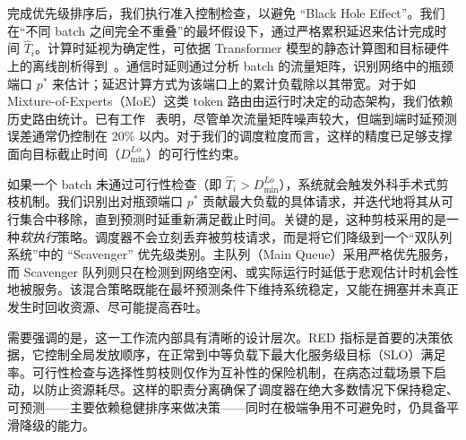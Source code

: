  完成优先级排序后，我们执行准入控制检查，以避免 “Black Hole Effect”。我们在“不同 batch 之间完全不重叠”的最坏假设下，通过严格累积延迟来估计完成时间 $\widehat{T}_i$。计算时延视为确定性，可依据 Transformer 模型的静态计算图和目标硬件上的离线剖析得到~\cite{agrawal2024vidur,distserve,mooncake}。通信时延则通过分析 batch 的流量矩阵，识别网络中的瓶颈端口 $p^*$ 来估计；延迟计算方式为该端口上的累计负载除以其带宽。对于如 Mixture-of-Experts（MoE）这类 token 路由由运行时决定的动态架构，我们依赖历史路由统计。已有工作~\cite{li2025optimizing} 表明，尽管单次流量矩阵噪声较大，但端到端时延预测误差通常仍控制在 20\% 以内。对于我们的调度粒度而言，这样的精度已足够支撑面向目标截止时间（$D^{Lo}_{\min}$）的可行性约束。

 如果一个 batch 未通过可行性检查（即 $\widehat{T}_i > D^{Lo}_{\min}$），系统就会触发外科手术式剪枝机制。我们识别出对瓶颈端口 $p^*$ 贡献最大负载的具体请求，并迭代地将其从可行集合中移除，直到预测时延重新满足截止时间。关键的是，这种剪枝采用的是一种\emph{软执行}策略。调度器不会立刻丢弃被剪枝请求，而是将它们降级到一个“双队列系统”中的 “Scavenger” 优先级类别。主队列（Main Queue）采用严格优先服务，而 Scavenger 队列则只在检测到网络空闲、或实际运行时延低于悲观估计时机会性地被服务。该混合策略既能在最坏预测条件下维持系统稳定，又能在拥塞并未真正发生时回收资源、尽可能提高吞吐。

 需要强调的是，这一工作流内部具有清晰的设计层次。RED 指标是首要的决策依据，它控制全局发放顺序，在正常到中等负载下最大化服务级目标（SLO）满足率。可行性检查与选择性剪枝则仅作为互补性的保险机制，在病态过载场景下启动，以防止资源耗尽。这样的职责分离确保了调度器在绝大多数情况下保持稳定、可预测——主要依赖稳健排序来做决策——同时在极端争用不可避免时，仍具备平滑降级的能力。
